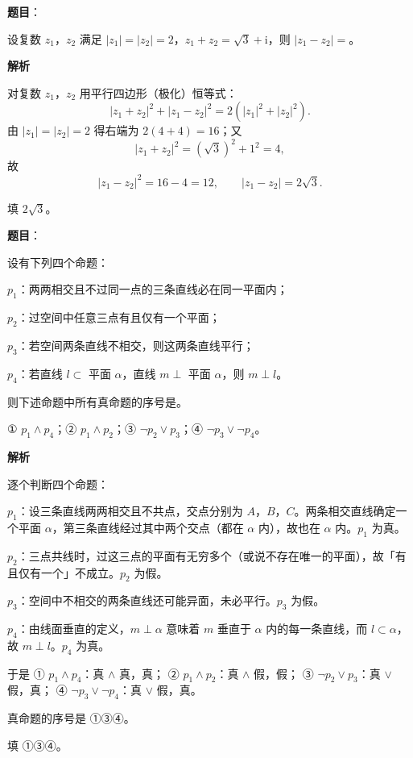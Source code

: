 \begin{answer}

\textbf{题目}：

设复数 $z_1$，$z_2$ 满足 $|z_1|=|z_2|=2$，$z_1+z_2=\sqrt3+\mathrm i$，则 $|z_1-z_2|=$\gkblank{}。

\textbf{解析}

对复数 $z_1$，$z_2$ 用平行四边形（极化）恒等式：
\nopagebreak[4]
\[|z_1+z_2|^2+|z_1-z_2|^2=2\left(|z_1|^2+|z_2|^2\right).\]
由 $|z_1|=|z_2|=2$ 得右端为 $2(4+4)=16$；又
\nopagebreak[4]
\[|z_1+z_2|^2=\left(\sqrt3\right)^2+1^2=4,\]
故
\nopagebreak[4]
\[|z_1-z_2|^2=16-4=12,\qquad |z_1-z_2|=2\sqrt3 .\]

填 $2\sqrt3$。


\end{answer}
\begin{answer}

\textbf{题目}：

设有下列四个命题：

$p_1$：两两相交且不过同一点的三条直线必在同一平面内；

$p_2$：过空间中任意三点有且仅有一个平面；

$p_3$：若空间两条直线不相交，则这两条直线平行；

$p_4$：若直线 $l\subset$ 平面 $\alpha$，直线 $m\perp$ 平面 $\alpha$，则 $m\perp l$。

则下述命题中所有真命题的序号是\gkblank{}。

① $p_1\wedge p_4$；② $p_1\wedge p_2$；③ $\neg p_2\vee p_3$；④ $\neg p_3\vee\neg p_4$。

\textbf{解析}

逐个判断四个命题：

$p_1$：设三条直线两两相交且不共点，交点分别为 $A$，$B$，$C$。两条相交直线确定一个平面 $\alpha$，第三条直线经过其中两个交点（都在 $\alpha$ 内），故也在 $\alpha$ 内。$p_1$ 为真。

$p_2$：三点共线时，过这三点的平面有无穷多个（或说不存在唯一的平面），故「有且仅有一个」不成立。$p_2$ 为假。

$p_3$：空间中不相交的两条直线还可能异面，未必平行。$p_3$ 为假。

$p_4$：由线面垂直的定义，$m\perp\alpha$ 意味着 $m$ 垂直于 $\alpha$ 内的每一条直线，而 $l\subset\alpha$，故 $m\perp l$。$p_4$ 为真。

于是
① $p_1\wedge p_4$：真 $\wedge$ 真，真；
② $p_1\wedge p_2$：真 $\wedge$ 假，假；
③ $\neg p_2\vee p_3$：真 $\vee$ 假，真；
④ $\neg p_3\vee\neg p_4$：真 $\vee$ 假，真。

真命题的序号是 ①③④。

填 ①③④。


\end{answer}
